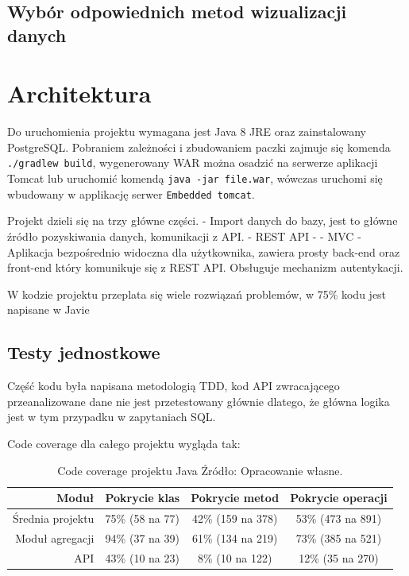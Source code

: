\documentclass[brudnopis]{xmgr}
\begin{document}
    \section{Wybór odpowiednich metod wizualizacji danych}


\chapter{Architektura}

    Do uruchomienia projektu wymagana jest Java 8 JRE oraz zainstalowany PostgreSQL.
    Pobraniem zależności i zbudowaniem paczki zajmuje się komenda \verb|./gradlew build|,
    wygenerowany WAR można osadzić na serwerze aplikacji Tomcat lub uruchomić komendą \verb|java -jar file.war|,
    wówczas uruchomi się wbudowany w applikację serwer \verb|Embedded tomcat|.

    Projekt dzieli się na trzy główne części.
    - Import danych do bazy, jest to główne źródło pozyskiwania danych, komunikacji z API.
    - REST API - %
    - MVC - Aplikacja bezpośrednio widoczna dla użytkownika, zawiera prosty back-end oraz front-end który komunikuje się z REST API.
    Obsługuje mechanizm autentykacji.

    W kodzie projektu przeplata się wiele rozwiązań problemów, w 75\% kodu jest napisane w Javie


\section{Testy jednostkowe}

Część kodu była napisana metodologią TDD,
kod API zwracającego przeanalizowane dane nie jest przetestowany głównie dlatego,
że główna logika jest w tym przypadku w zapytaniach SQL.

Code coverage dla całego projektu wygląda tak:
\begin{table}

	\begin{tabular}{|r|c|c|c|}
		\hline
		Moduł & Pokrycie klas & Pokrycie metod & Pokrycie operacji \\ \hline
		Średnia projektu & 75\% (58 na 77) & 42\% (159 na 378) & 53\% (473 na 891) \\
		Moduł agregacji & 94\% (37 na 39) & 61\% (134 na 219) & 73\% (385 na 521) \\
		API & 43\% (10 na 23) & 8\% (10 na 122) & 12\% (35 na 270) \\  \hline
	\end{tabular}

    \caption{
	Code coverage projektu Java
	\newline Źródło: Opracowanie własne.
	}
\label{Projekt --- Code coverage}
\end{table}
\end{document}
